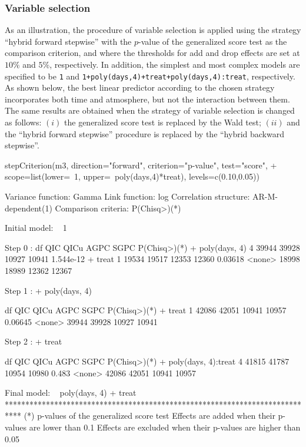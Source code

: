 \subsubsection{Variable selection}
As an illustration, the procedure of variable selection is applied using the strategy ``hybrid forward stepwise'' with the $p$-value of the generalized score test as the comparison criterion, and where the thresholds for add and drop effects are set at $10\%$ and $5\%$, respectively. In addition, the simplest and most complex models are specified to be {\tt 1} and {\tt 1+poly(days,4)+treat+poly(days,4):treat}, respectively. As shown below, the best linear predictor according to the chosen strategy incorporates both time and atmosphere, but not the interaction between them. The same results are obtained when the strategy of variable selection is changed as follows: $(i)$ the generalized score test is replaced by the Wald test; $(ii)$ and the ``hybrid forward stepwise'' procedure is replaced by the ``hybrid backward stepwise''.
 
\begin{example}
stepCriterion(m3, direction="forward", criterion="p-value", test="score",
+             scope=list(lower=~1, upper=~poly(days,4)*treat), levels=c(0.10,0.05))

    Variance function:  Gamma
        Link function:  log 
Correlation structure:  AR-M-dependent(1) 
  Comparison criteria:  P(Chisq>)(*)

Initial model:
~ 1 

Step 0 :
                       df   QIC  QICu  AGPC  SGPC P(Chisq>)(*)
+ poly(days, 4)         4 39944 39928 10927 10941    1.544e-12
+ treat                 1 19534 19517 12353 12360      0.03618
<none>                    18998 18989 12362 12367             

Step 1 : + poly(days, 4) 

                       df   QIC  QICu  AGPC  SGPC P(Chisq>)(*)
+ treat                 1 42086 42051 10941 10957      0.06645
<none>                    39944 39928 10927 10941             

Step 2 : + treat 

                       df   QIC  QICu  AGPC  SGPC P(Chisq>)(*)
+ poly(days, 4):treat   4 41815 41787 10954 10980        0.483
<none>                    42086 42051 10941 10957             

Final model:
~ poly(days, 4) + treat 
****************************************************************************
(*) p-values of the generalized score test
 Effects are added when their p-values are lower than 0.1
 Effects are excluded when their p-values are higher than 0.05
\end{example}

